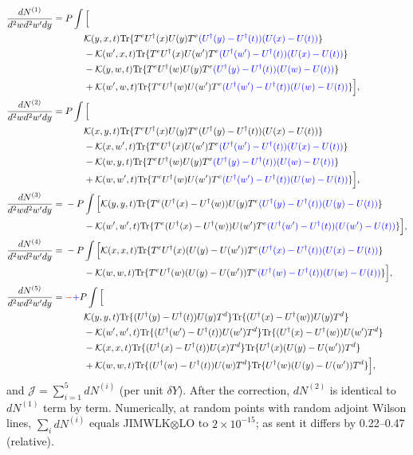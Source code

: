 \documentclass[10pt]{article}
\numberwithin{equation}{section}
\newcommand{\new}[1]{{\color{blue}#1}}
\newcommand{\old}[1]{{\color{red}#1}}
\begin{document}
\begin{align}
\frac{dN^{(1)}}{d^2wd^2w'dy}={}&P\int\Big[\notag\\&\qquad\mathcal K(y,x,t){\rm Tr}\{T^eU^\dagger(x)U(y)T^e\new{(U^\dagger(y)-U^\dagger(t))(U(x)-U(t))}\}\notag\\&\qquad-\mathcal K(w',x,t){\rm Tr}\{T^eU^\dagger(x)U(w')T^e\new{(U^\dagger(w')-U^\dagger(t))(U(x)-U(t))}\}\notag\\
&\qquad-\mathcal K(y,w,t){\rm Tr}\{T^eU^\dagger(w)U(y)T^e\new{(U^\dagger(y)-U^\dagger(t))(U(w)-U(t))}\}\notag\\&\qquad+\mathcal K(w',w,t){\rm Tr}\{T^eU^\dagger(w)U(w')T^e\new{(U^\dagger(w')-U^\dagger(t))(U(w)-U(t))}\}\Big],\notag\\
\frac{dN^{(2)}}{d^2wd^2w'dy}={}&P\int\Big[\notag\\&\qquad\mathcal K(x,y,t){\rm Tr}\{T^eU^\dagger(x)U(y)T^e(U^\dagger(y)-U^\dagger(t))(U(x)-U(t))\}\notag\\&\qquad-\mathcal K(x,w',t){\rm Tr}\{T^eU^\dagger(x)U(w')T^e\new{(U^\dagger(w')-U^\dagger(t))(U(x)-U(t))}\}\notag\\
&\qquad-\mathcal K(w,y,t){\rm Tr}\{T^eU^\dagger(w)U(y)T^e\new{(U^\dagger(y)-U^\dagger(t))(U(w)-U(t))}\}\notag\\&\qquad+\mathcal K(w,w',t){\rm Tr}\{T^eU^\dagger(w)U(w')T^e\new{(U^\dagger(w')-U^\dagger(t))(U(w)-U(t))}\}\Big],\notag\\
\frac{dN^{(3)}}{d^2wd^2w'dy}={}&-P\int\Big[\mathcal K(y,y,t){\rm Tr}\{T^e(U^\dagger(x)-U^\dagger(w))U(y)T^e\new{(U^\dagger(y)-U^\dagger(t))(U(y)-U(t))}\}\notag\\
&\qquad-\mathcal K(w',w',t){\rm Tr}\{T^e(U^\dagger(x)-U^\dagger(w))U(w')T^e\new{(U^\dagger(w')-U^\dagger(t))(U(w')-U(t))}\}\Big],\notag\\
\frac{dN^{(4)}}{d^2wd^2w'dy}={}&-P\int\Big[\mathcal K(x,x,t){\rm Tr}\{T^eU^\dagger(x)(U(y)-U(w'))T^e\new{(U^\dagger(x)-U^\dagger(t))(U(x)-U(t))}\}\notag\\
&\qquad-\mathcal K(w,w,t){\rm Tr}\{T^eU^\dagger(w)(U(y)-U(w'))T^e\new{(U^\dagger(w)-U^\dagger(t))(U(w)-U(t))}\}\Big],\notag\\
\frac{dN^{(5)}}{d^2wd^2w'dy}={}&\old{-}\new{+}P\int\Big[\notag\\
&\qquad\mathcal K(y,y,t){\rm Tr}\{(U^\dagger(y)-U^\dagger(t))U(y)T^d\}{\rm Tr}\{(U^\dagger(x)-U^\dagger(w))U(y)T^d\}\notag\\
&\qquad-\mathcal K(w',w',t){\rm Tr}\{(U^\dagger(w')-U^\dagger(t))U(w')T^d\}{\rm Tr}\{(U^\dagger(x)-U^\dagger(w))U(w')T^d\}\notag\\
&\qquad-\mathcal K(x,x,t){\rm Tr}\{(U^\dagger(x)-U^\dagger(t))U(x)T^d\}{\rm Tr}\{U^\dagger(x)(U(y)-U(w'))T^d\}\notag\\
&\qquad+\mathcal K(w,w,t){\rm Tr}\{(U^\dagger(w)-U^\dagger(t))U(w)T^d\}{\rm Tr}\{U^\dagger(w)(U(y)-U(w'))T^d\}\Big],
\label{eq:JIMc}
\end{align}
and $\mathcal J=\sum_{i=1}^5 dN^{(i)}$ (per unit $\delta Y$). After the correction, $dN^{(2)}$ is identical to $dN^{(1)}$ term by term. Numerically, at random points with random adjoint Wilson lines, $\sum_i dN^{(i)}$ equals JIMWLK$\otimes$LO to $2\times10^{-15}$; as sent it differs by 0.22--0.47 (relative).
\end{document}
